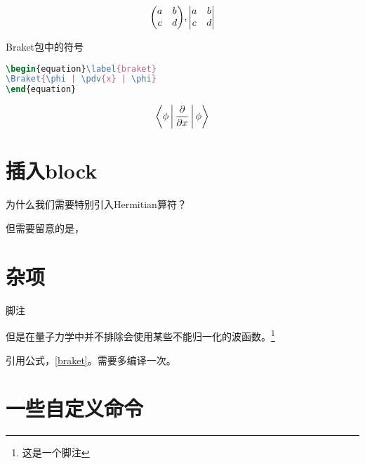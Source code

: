 \documentclass[11pt,a4paper,onecolumn]{article}
\begin{document}
\begin{equation}\label{key}
\mqty( a & b \\ c & d ), \mqty| a & b \\ c & d |
\end{equation}

Braket包中的符号
\begin{lstlisting}[language=TeX]
\begin{equation}\label{braket}
\Braket{\phi | \pdv{x} | \phi}
\end{equation}
\end{lstlisting}

\begin{equation}\label{braket}
\Braket{\phi | \pdv{x} | \phi}
\end{equation}


\section{插入block}



\begin{note}
	为什么我们需要特别引入Hermitian算符？\\
	\lipsum[1]
\end{note}

\begin{warning}
	但需要留意的是，\lipsum[2]
\end{warning}




\section{杂项}
脚注
\begin{note}	
	但是在量子力学中并不排除会使用某些不能归一化的波函数。\footnote{这是一个脚注}
\end{note}




引用公式，\eqref{braket}。需要多编译一次。

\section{一些自定义命令}
\end{document}
